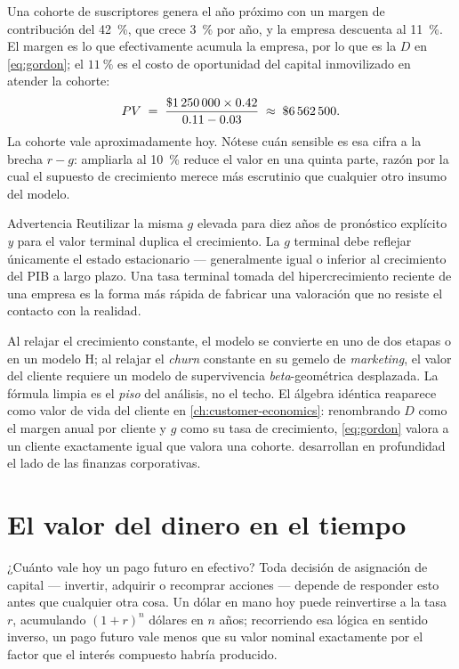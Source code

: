 \begin{example}
Una cohorte de suscriptores genera  el año próximo con un margen de contribución
del \qty{42}{\percent}, que crece \qty{3}{\percent} por año, y la empresa descuenta al \qty{11}{\percent}. El
margen es lo que efectivamente acumula la empresa, por lo que es la \(D\) en \cref{eq:gordon};
el \(\qty{11}{\percent}\) es el costo de oportunidad del capital inmovilizado en atender la
cohorte:
\[
  PV \;=\; \frac{\$\num{1250000}\times 0.42}{0.11-0.03}\;\approx\;\$\num{6562500}.
\]
La cohorte vale aproximadamente  hoy. Nótese cuán sensible es esa cifra a la
brecha \(r-g\): ampliarla al \qty{10}{\percent} reduce el valor en una quinta parte, razón por la
cual el supuesto de crecimiento merece más escrutinio que cualquier otro insumo del modelo.
\end{example}

\begin{admonition}{Advertencia}
Reutilizar la misma \(g\) elevada para diez años de pronóstico explícito \emph{y} para el valor
terminal duplica el crecimiento. La \(g\) terminal debe reflejar únicamente el estado estacionario
--- generalmente igual o inferior al crecimiento del PIB a largo plazo. Una tasa terminal tomada
del hipercrecimiento reciente de una empresa es la forma más rápida de fabricar una valoración
que no resiste el contacto con la realidad.
\end{admonition}

Al relajar el crecimiento constante, el modelo se convierte en uno de dos etapas o en un
modelo H; al relajar el \emph{churn} constante en su gemelo de \emph{marketing}, el valor del
cliente requiere un modelo de supervivencia \emph{beta}-geométrica desplazada. La fórmula
limpia es el \emph{piso} del análisis, no el techo. El álgebra idéntica reaparece como valor
de vida del cliente en \cref{ch:customer-economics}: renombrando \(D\) como el margen anual por
cliente y \(g\) como su tasa de crecimiento, \cref{eq:gordon} valora a un cliente exactamente
igual que valora una cohorte. \textcite{brealey2020} desarrollan en profundidad el lado de las
finanzas corporativas.

\section{El valor del dinero en el tiempo}\label{sec:time-value-of-money}

¿Cuánto vale hoy un pago futuro en efectivo? Toda decisión de asignación de capital ---
invertir, adquirir o recomprar acciones --- depende de responder esto antes que cualquier
otra cosa. Un dólar en mano hoy puede reinvertirse a la tasa \(r\), acumulando \((1+r)^n\)
dólares en \(n\) años; recorriendo esa lógica en sentido inverso, un pago futuro vale menos
que su valor nominal exactamente por el factor que el interés compuesto habría producido.

